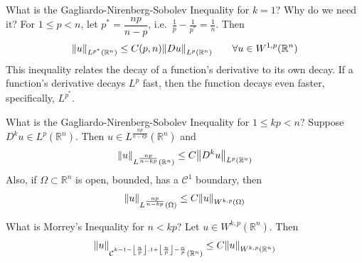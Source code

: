 \documentclass[avery5388,grid,frame]{flashcards}
\def\Rl{\mathbb{R}}
\begin{document}
\begin{flashcard}
    {What is the Gagliardo-Nirenberg-Sobolev Inequality for $k=1$?  Why do we need it?}
    For $1 \leq p < n$, let $p^* = \dfrac{np}{n - p}$, i.e.~$\displaystyle\frac{1}{p} - \frac{1}{p^*} = \frac{1}{n}$.  Then
    \begin{align*}
        \norm{u}_{L^{p^*}(\Rl^n)} \leq C(p,n)\norm{Du}_{L^p(\Rl^n)} \qquad \forall u \in W^{1,p}(\Rl^n)
    \end{align*}
    This inequality relates the decay of a function's derivative to its own decay.  If a function's derivative decays $L^p$ fast, then the function decays even faster, specifically, $L^{p^*}$.
\end{flashcard}

\begin{flashcard}
    {What is the Gagliardo-Nirenberg-Sobolev Inequality for $1\leq kp < n$?}
    Suppose $D^k u \in L^p(\Rl^n)$.  Then $u \in L^{\frac{np}{n-kp}}(\Rl^n)$ and
    \begin{align*}
        \norm{u}_{L^{\frac{np}{n-kp}}(\Rl^n)} \leq C\norm{D^ku}_{L^p(\Rl^n)}
    \end{align*}
    Also, if $\Omega \subset \Rl^n$ is open, bounded, has a $\mathcal{C}^1$ boundary, then
    \begin{align*}
        \norm{u}_{L^{\frac{np}{n-kp}}(\Omega)} \leq C\norm{u}_{W^{k,p}(\Omega)}
    \end{align*}
\end{flashcard}

\begin{flashcard}
    {What is Morrey's Inequality for $n < kp$?}
    Let $u \in W^{k,p}(\Rl^n)$.  Then
    \begin{align*}
        \norm{u}_{\mathcal{C}^{k - 1 - \left\lfloor\frac{n}{p}\right\rfloor, 1 + \left\lfloor\frac{n}{p}\right\rfloor - \frac{n}{p}}(\Rl^n)} \leq C\norm{u}_{W^{k,p}(\Rl^n)}
    \end{align*}
\end{flashcard}
\end{document}
